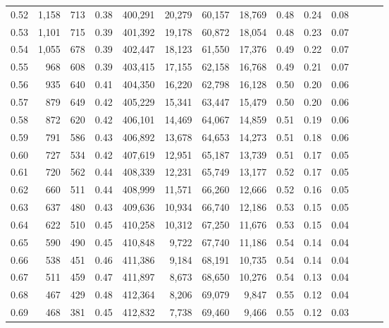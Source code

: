 \begin{tabular}{rrrrrrrrrrrrrr}
0.52 &   1,158 &    713 &  0.38 &  400,291 &   20,279 &  60,157 &  18,769 &  0.48 &  0.24 &      0.08 \\
0.53 &   1,101 &    715 &  0.39 &  401,392 &   19,178 &  60,872 &  18,054 &  0.48 &  0.23 &      0.07 \\
0.54 &   1,055 &    678 &  0.39 &  402,447 &   18,123 &  61,550 &  17,376 &  0.49 &  0.22 &      0.07 \\
0.55 &     968 &    608 &  0.39 &  403,415 &   17,155 &  62,158 &  16,768 &  0.49 &  0.21 &      0.07 \\
0.56 &     935 &    640 &  0.41 &  404,350 &   16,220 &  62,798 &  16,128 &  0.50 &  0.20 &      0.06 \\
0.57 &     879 &    649 &  0.42 &  405,229 &   15,341 &  63,447 &  15,479 &  0.50 &  0.20 &      0.06 \\
0.58 &     872 &    620 &  0.42 &  406,101 &   14,469 &  64,067 &  14,859 &  0.51 &  0.19 &      0.06 \\
0.59 &     791 &    586 &  0.43 &  406,892 &   13,678 &  64,653 &  14,273 &  0.51 &  0.18 &      0.06 \\
0.60 &     727 &    534 &  0.42 &  407,619 &   12,951 &  65,187 &  13,739 &  0.51 &  0.17 &      0.05 \\
0.61 &     720 &    562 &  0.44 &  408,339 &   12,231 &  65,749 &  13,177 &  0.52 &  0.17 &      0.05 \\
0.62 &     660 &    511 &  0.44 &  408,999 &   11,571 &  66,260 &  12,666 &  0.52 &  0.16 &      0.05 \\
0.63 &     637 &    480 &  0.43 &  409,636 &   10,934 &  66,740 &  12,186 &  0.53 &  0.15 &      0.05 \\
0.64 &     622 &    510 &  0.45 &  410,258 &   10,312 &  67,250 &  11,676 &  0.53 &  0.15 &      0.04 \\
0.65 &     590 &    490 &  0.45 &  410,848 &    9,722 &  67,740 &  11,186 &  0.54 &  0.14 &      0.04 \\
0.66 &     538 &    451 &  0.46 &  411,386 &    9,184 &  68,191 &  10,735 &  0.54 &  0.14 &      0.04 \\
0.67 &     511 &    459 &  0.47 &  411,897 &    8,673 &  68,650 &  10,276 &  0.54 &  0.13 &      0.04 \\
0.68 &     467 &    429 &  0.48 &  412,364 &    8,206 &  69,079 &   9,847 &  0.55 &  0.12 &      0.04 \\
0.69 &     468 &    381 &  0.45 &  412,832 &    7,738 &  69,460 &   9,466 &  0.55 &  0.12 &      0.03 \\

\end{tabular}
